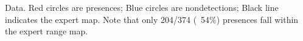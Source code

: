 Data. Red circles are presences; Blue circles are nondetections; Black line indicates the expert map. Note that only 204/374 (~54\%) presences fall within the expert range map.